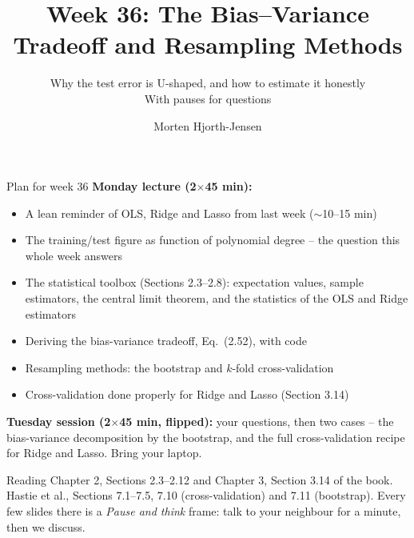 \documentclass[10pt,aspectratio=169]{beamer}
\title{Week 36: The Bias--Variance Tradeoff and Resampling Methods}
\subtitle{Why the test error is U-shaped, and how to estimate it honestly\\[3pt]
  \small With pauses for questions}
\author{Morten Hjorth-Jensen}
\institute{Department of Physics and Center for Computing in Science Education,\\
  University of Oslo, Norway}
\date{}
\begin{document}
\begin{frame}
\titlepage
\end{frame}

\begin{frame}{Plan for week 36}
\textbf{Monday lecture (2$\times$45 min):}
\begin{itemize}
  \item A lean reminder of OLS, Ridge and Lasso from last week ($\sim$10--15 min)
  \item The training/test figure as function of polynomial degree -- the
        question this whole week answers
  \item The statistical toolbox (Sections 2.3--2.8): expectation values,
        sample estimators, the central limit theorem, and the statistics of
        the OLS and Ridge estimators
  \item Deriving the bias-variance tradeoff, Eq.~(2.52), with code
  \item Resampling methods: the bootstrap and $k$-fold cross-validation
  \item Cross-validation done properly for Ridge and Lasso (Section 3.14)
\end{itemize}
\vspace{4pt}
\textbf{Tuesday session (2$\times$45 min, flipped):} your questions, then two
cases -- the bias-variance decomposition by the bootstrap, and the full
cross-validation recipe for Ridge and Lasso.  Bring your laptop.
\vspace{4pt}
\begin{block}{Reading}
Chapter 2, Sections 2.3--2.12 and Chapter 3, Section 3.14 of the book.
Hastie et al., Sections 7.1--7.5, 7.10 (cross-validation) and 7.11
(bootstrap).  Every few slides there is a
\emph{Pause and think} frame: talk to your neighbour for a minute, then we
discuss.
\end{block}
\end{frame}

\end{document}
